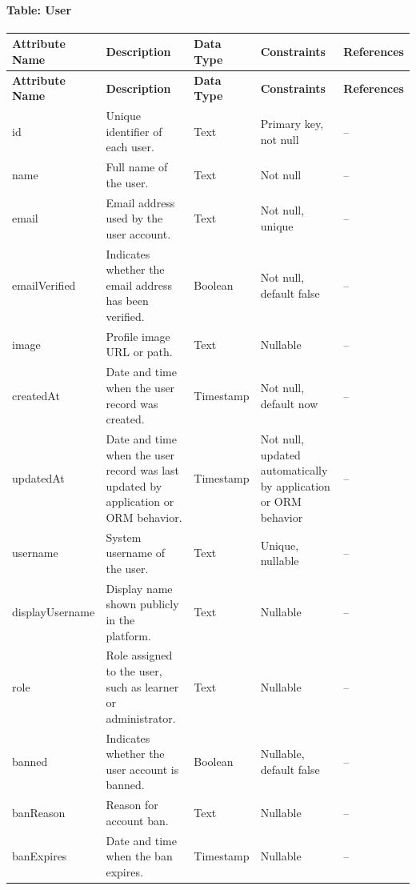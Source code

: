 \newcommand{\ddheader}{
\toprule
\textbf{Attribute Name} & \textbf{Description} & \textbf{Data Type} & \textbf{Constraints} & \textbf{References} \\
\midrule
\endfirsthead
\toprule
\textbf{Attribute Name} & \textbf{Description} & \textbf{Data Type} & \textbf{Constraints} & \textbf{References} \\
\midrule
\endhead
\bottomrule
\endfoot
}

\paragraph{Table: User}
\begin{longtable}{L{2.6cm}L{4.5cm}L{2.1cm}L{3.3cm}L{2.2cm}}
\ddheader
id & Unique identifier of each user. & Text & Primary key, not null & -- \\
name & Full name of the user. & Text & Not null & -- \\
email & Email address used by the user account. & Text & Not null, unique & -- \\
emailVerified & Indicates whether the email address has been verified. & Boolean & Not null, default false & -- \\
image & Profile image URL or path. & Text & Nullable & -- \\
createdAt & Date and time when the user record was created. & Timestamp & Not null, default now & -- \\
updatedAt & Date and time when the user record was last updated by application or ORM behavior. & Timestamp & Not null, updated automatically by application or ORM behavior & -- \\
username & System username of the user. & Text & Unique, nullable & -- \\
displayUsername & Display name shown publicly in the platform. & Text & Nullable & -- \\
role & Role assigned to the user, such as learner or administrator. & Text & Nullable & -- \\
banned & Indicates whether the user account is banned. & Boolean & Nullable, default false & -- \\
banReason & Reason for account ban. & Text & Nullable & -- \\
banExpires & Date and time when the ban expires. & Timestamp & Nullable & -- \\
\end{longtable}

